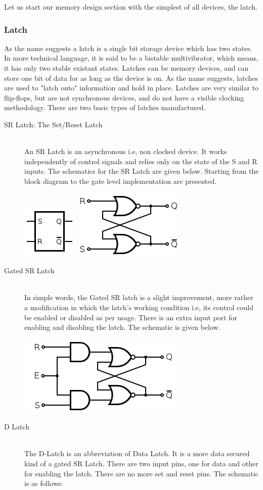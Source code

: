 \documentclass[11pt]{article}
\begin{document}
Let us start our memory design section with the simplest of all devices, the latch.
\subsubsection{Latch}
As the name suggests a latch is a single bit storage device which has two states. In more technical language, it is said to be a bistable multivibrator, which means, it has only two stable existant states. Latches can be memory devices, and can store one bit of data for as long as the device is on. As the name suggests, latches are used to "latch onto" information and hold in place. Latches are very similar to flip-flops, but are not synchronous devices, and do not have a visible clocking methodology. There are two basic types of latches manufactured.
\begin{description}
	\item[SR Latch: The Set/Reset Latch] \hfill \\
	An SR Latch is an asynchronous i.e, non clocked device. It works independently of control signals and relies only on the state of the S and R inputs. The schematics for the SR Latch are given below. Starting from the block diagram to the gate level implementation are presented.

	\includegraphics[scale=1]{srl1.png}
	\includegraphics[scale=1]{srl2.png}
	\item[Gated SR Latch] \hfill \\
	In simple words, the Gated SR latch is a slight improvement, more rather a modification in which the latch's working condition i.e, its control could be enabled or disabled as per usage. There is an extra input port for enabling and disabling the latch. The schematic is given below.
	
	\includegraphics[scale=1]{gsrl.png}
	\item[D Latch] \hfill \\
	The D-Latch is an abbreviation of Data Latch. It is a more data secured kind of a gated SR Latch. There are two input pins, one for data and other for enabling the latch. There are no more set and reset pins. The schematic is as follows:


\end{description}
\end{document}
